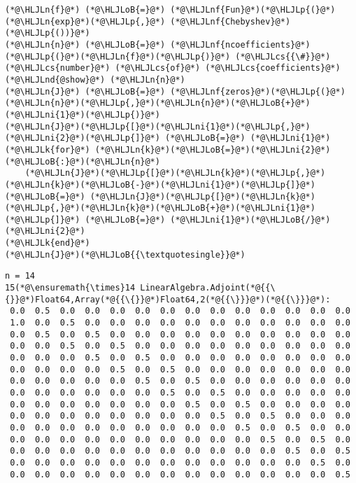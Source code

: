 \documentclass[12pt,landscape]{article}
\newcommand{\HLJLk}[1]{\textcolor[RGB]{148,91,176}{\textbf{#1}}}
\newcommand{\HLJLn}[1]{#1}
\newcommand{\HLJLnd}[1]{\textcolor[RGB]{214,102,97}{#1}}
\newcommand{\HLJLnf}[1]{\textcolor[RGB]{66,102,213}{#1}}
\newcommand{\HLJLni}[1]{\textcolor[RGB]{59,151,46}{#1}}
\newcommand{\HLJLoB}[1]{\textcolor[RGB]{102,102,102}{\textbf{#1}}}
\newcommand{\HLJLp}[1]{#1}
\newcommand{\HLJLcs}[1]{\textcolor[RGB]{153,153,119}{\textit{#1}}}
\begin{document}
{\begin{lstlisting}
(*@\HLJLn{f}@*) (*@\HLJLoB{=}@*) (*@\HLJLnf{Fun}@*)(*@\HLJLp{(}@*)(*@\HLJLn{exp}@*)(*@\HLJLp{,}@*) (*@\HLJLnf{Chebyshev}@*)(*@\HLJLp{())}@*)
(*@\HLJLn{n}@*) (*@\HLJLoB{=}@*) (*@\HLJLnf{ncoefficients}@*)(*@\HLJLp{(}@*)(*@\HLJLn{f}@*)(*@\HLJLp{)}@*) (*@\HLJLcs{{\#}}@*) (*@\HLJLcs{number}@*) (*@\HLJLcs{of}@*) (*@\HLJLcs{coefficients}@*)
(*@\HLJLnd{@show}@*) (*@\HLJLn{n}@*)
(*@\HLJLn{J}@*) (*@\HLJLoB{=}@*) (*@\HLJLnf{zeros}@*)(*@\HLJLp{(}@*)(*@\HLJLn{n}@*)(*@\HLJLp{,}@*)(*@\HLJLn{n}@*)(*@\HLJLoB{+}@*)(*@\HLJLni{1}@*)(*@\HLJLp{)}@*)
(*@\HLJLn{J}@*)(*@\HLJLp{[}@*)(*@\HLJLni{1}@*)(*@\HLJLp{,}@*)(*@\HLJLni{2}@*)(*@\HLJLp{]}@*) (*@\HLJLoB{=}@*) (*@\HLJLni{1}@*)
(*@\HLJLk{for}@*) (*@\HLJLn{k}@*)(*@\HLJLoB{=}@*)(*@\HLJLni{2}@*)(*@\HLJLoB{:}@*)(*@\HLJLn{n}@*)
    (*@\HLJLn{J}@*)(*@\HLJLp{[}@*)(*@\HLJLn{k}@*)(*@\HLJLp{,}@*)(*@\HLJLn{k}@*)(*@\HLJLoB{-}@*)(*@\HLJLni{1}@*)(*@\HLJLp{]}@*) (*@\HLJLoB{=}@*) (*@\HLJLn{J}@*)(*@\HLJLp{[}@*)(*@\HLJLn{k}@*)(*@\HLJLp{,}@*)(*@\HLJLn{k}@*)(*@\HLJLoB{+}@*)(*@\HLJLni{1}@*)(*@\HLJLp{]}@*) (*@\HLJLoB{=}@*) (*@\HLJLni{1}@*)(*@\HLJLoB{/}@*)(*@\HLJLni{2}@*)
(*@\HLJLk{end}@*)
(*@\HLJLn{J}@*)(*@\HLJLoB{{\textquotesingle}}@*)
\end{lstlisting}

\begin{lstlisting}
n = 14
15(*@\ensuremath{\times}14 LinearAlgebra.Adjoint(*@{{\{}}@*)Float64,Array(*@{{\{}}@*)Float64,2(*@{{\}}}@*)(*@{{\}}}@*):
 0.0  0.5  0.0  0.0  0.0  0.0  0.0  0.0  0.0  0.0  0.0  0.0  0.0  0.0
 1.0  0.0  0.5  0.0  0.0  0.0  0.0  0.0  0.0  0.0  0.0  0.0  0.0  0.0
 0.0  0.5  0.0  0.5  0.0  0.0  0.0  0.0  0.0  0.0  0.0  0.0  0.0  0.0
 0.0  0.0  0.5  0.0  0.5  0.0  0.0  0.0  0.0  0.0  0.0  0.0  0.0  0.0
 0.0  0.0  0.0  0.5  0.0  0.5  0.0  0.0  0.0  0.0  0.0  0.0  0.0  0.0
 0.0  0.0  0.0  0.0  0.5  0.0  0.5  0.0  0.0  0.0  0.0  0.0  0.0  0.0
 0.0  0.0  0.0  0.0  0.0  0.5  0.0  0.5  0.0  0.0  0.0  0.0  0.0  0.0
 0.0  0.0  0.0  0.0  0.0  0.0  0.5  0.0  0.5  0.0  0.0  0.0  0.0  0.0
 0.0  0.0  0.0  0.0  0.0  0.0  0.0  0.5  0.0  0.5  0.0  0.0  0.0  0.0
 0.0  0.0  0.0  0.0  0.0  0.0  0.0  0.0  0.5  0.0  0.5  0.0  0.0  0.0
 0.0  0.0  0.0  0.0  0.0  0.0  0.0  0.0  0.0  0.5  0.0  0.5  0.0  0.0
 0.0  0.0  0.0  0.0  0.0  0.0  0.0  0.0  0.0  0.0  0.5  0.0  0.5  0.0
 0.0  0.0  0.0  0.0  0.0  0.0  0.0  0.0  0.0  0.0  0.0  0.5  0.0  0.5
 0.0  0.0  0.0  0.0  0.0  0.0  0.0  0.0  0.0  0.0  0.0  0.0  0.5  0.0
 0.0  0.0  0.0  0.0  0.0  0.0  0.0  0.0  0.0  0.0  0.0  0.0  0.0  0.5
\end{lstlisting}


}
\end{document}
